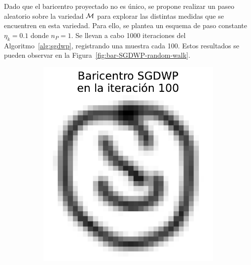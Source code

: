 Dado que el baricentro proyectado no es único, se propone realizar un paseo aleatorio sobre la variedad $\operatorname{\mathcal{M}}$ para explorar las distintas medidas que se encuentren en esta variedad. Para ello, se plantea un esquema de paso constante $\eta_k = 0.1$ donde $n_P = 1$.
Se llevan a cabo 1000 iteraciones del Algoritmo~\ref*{alg:sgdwp}, registrando una muestra cada 100. Estos resultados se pueden observar en la Figura~\ref{fig:bar-SGDWP-random-walk}.

\begin{figure}[H]
    \centering
    \begin{subfigure}[b]{0.17\textwidth}
        \centering
        \includegraphics[width=\textwidth]{img/sgdwp-rw/bar-SGDWP-random-walk-iter-01.pdf}
        \label{fig:bar-SGDWP-random-walk-iter-01}
    \end{subfigure}
    \hfill
    \begin{subfigure}[b]{0.17\textwidth}
        \centering

\end{subfigure}
\end{figure}
